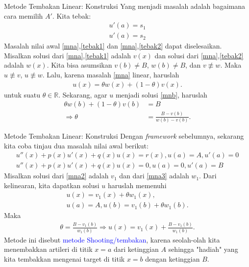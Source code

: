 \documentclass[xcolor={dvipsnames}, 9pt]{beamer}
\renewcommand{\emph}[1]{\textcolor{Blue}{#1}}
\begin{document}
	\begin{frame}{Metode Tembakan Linear: Konstruksi}
		Yang menjadi masalah adalah bagaimana cara memilih $A'$. Kita tebak:
		\begin{align}
			u'(a) = s_1 \label{tebak1}\\
			u'(a) = s_2 \label{tebak2}
		\end{align}
		Masalah nilai awal \eqref{mna},\eqref{tebak1} dan \eqref{mna},\eqref{tebak2} dapat diselesaikan. Misalkan solusi dari \eqref{mna},\eqref{tebak1} adalah $v(x)$ dan solusi dari \eqref{mna},\eqref{tebak2} adalah $w(x)$. Kita bisa asumsikan $v(b)\neq B$, $w(b)\neq B$, dan $v\not\equiv w$. Maka $u\not\equiv v$, $u\not\equiv w$. Lalu, karena masalah \eqref{mna} linear, haruslah
		\begin{align*}
			u(x) = \theta w(x) + (1-\theta)v(x).
		\end{align*}
		untuk suatu $\theta\in\mathbb{R}$. \newline
		Sekarang, agar $u$ menjadi solusi \eqref{mnb}, haruslah
		\begin{align*}
			\theta w(b) + (1-\theta)v(b) &= B \\
			\Rightarrow \theta &= \frac{B - v(b)}{w(b)-v(b)}.
		\end{align*}
	\end{frame}
	\begin{frame}{Metode Tembakan Linear: Konstruksi}
		Dengan \textit{framework} sebelumnya, sekarang kita coba tinjau dua masalah nilai awal berikut:
		\begin{gather}
			u''(x) + p(x)u'(x) + q(x)u(x) = r(x), u(a) = A, u'(a) = 0 \label{mna2}\\
			u''(x) + p(x)u'(x) + q(x)u(x) = 0, u(a) = 0, u'(a) = B \label{mna3}
		\end{gather}
		Misalkan solusi dari \eqref{mna2} adalah $v_1$ dan dari \eqref{mna3} adalah $w_1$. Dari kelinearan, kita dapatkan solusi $u$ haruslah memenuhi
		\begin{align*}
			u(x) = v_1(x) + \theta w_1(x), \\
			u(a) = A, u(b) = v_1(b) + \theta w_1(b).
		\end{align*} 
		Maka
		\begin{align*}
			\theta = \frac{B - v_1(b)}{w_1(b)} \Rightarrow u(x) = v_1(x) + \frac{B - v_1(b)}{w_1(b)}.
		\end{align*}
		Metode ini disebut \emph{metode Shooting/tembakan}, karena seolah-olah kita menembakkan artileri di titik $x=a$ dari ketinggian $A$ sehingga "hadiah" yang kita tembakkan mengenai target di titik $x=b$ dengan ketinggian $B$.
	\end{frame}
\end{document}
